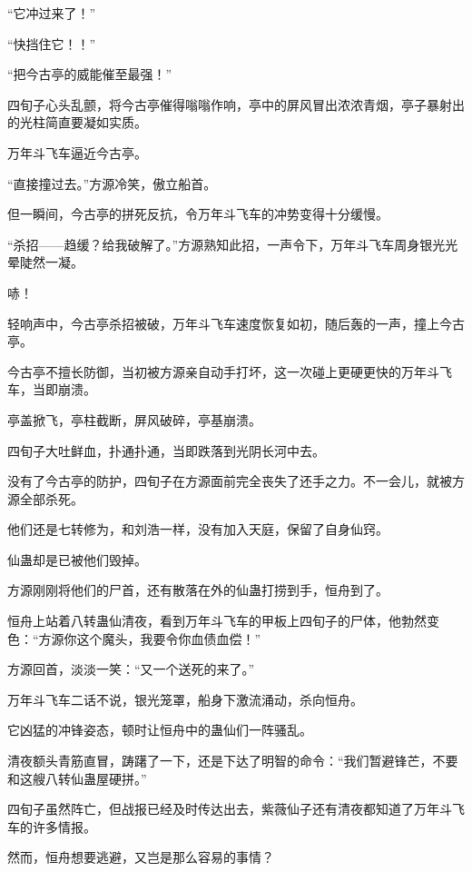
\begin{this_body}



“它冲过来了！”

“快挡住它！！”

“把今古亭的威能催至最强！”

四旬子心头乱颤，将今古亭催得嗡嗡作响，亭中的屏风冒出浓浓青烟，亭子暴射出的光柱简直要凝如实质。

万年斗飞车逼近今古亭。

“直接撞过去。”方源冷笑，傲立船首。

但一瞬间，今古亭的拼死反抗，令万年斗飞车的冲势变得十分缓慢。

“杀招——趋缓？给我破解了。”方源熟知此招，一声令下，万年斗飞车周身银光光晕陡然一凝。

哧！

轻响声中，今古亭杀招被破，万年斗飞车速度恢复如初，随后轰的一声，撞上今古亭。

今古亭不擅长防御，当初被方源亲自动手打坏，这一次碰上更硬更快的万年斗飞车，当即崩溃。

亭盖掀飞，亭柱截断，屏风破碎，亭基崩溃。

四旬子大吐鲜血，扑通扑通，当即跌落到光阴长河中去。

没有了今古亭的防护，四旬子在方源面前完全丧失了还手之力。不一会儿，就被方源全部杀死。

他们还是七转修为，和刘浩一样，没有加入天庭，保留了自身仙窍。

仙蛊却是已被他们毁掉。

方源刚刚将他们的尸首，还有散落在外的仙蛊打捞到手，恒舟到了。

恒舟上站着八转蛊仙清夜，看到万年斗飞车的甲板上四旬子的尸体，他勃然变色：“方源你这个魔头，我要令你血债血偿！”

方源回首，淡淡一笑：“又一个送死的来了。”

万年斗飞车二话不说，银光笼罩，船身下激流涌动，杀向恒舟。

它凶猛的冲锋姿态，顿时让恒舟中的蛊仙们一阵骚乱。

清夜额头青筋直冒，踌躇了一下，还是下达了明智的命令：“我们暂避锋芒，不要和这艘八转仙蛊屋硬拼。”

四旬子虽然阵亡，但战报已经及时传达出去，紫薇仙子还有清夜都知道了万年斗飞车的许多情报。

然而，恒舟想要逃避，又岂是那么容易的事情？


\end{this_body}
